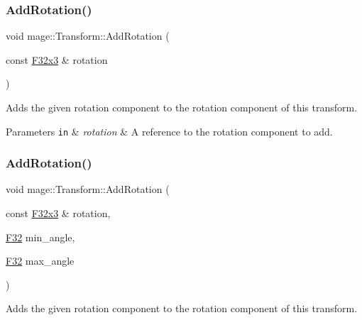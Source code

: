 \subsubsection{\texorpdfstring{Add\+Rotation()}{AddRotation()}\hspace{0.1cm}{\footnotesize\ttfamily [3/6]}}
{\footnotesize\ttfamily void mage\+::\+Transform\+::\+Add\+Rotation (\begin{DoxyParamCaption}\item[{const \mbox{\hyperlink{namespacemage_a1e3c7a882af461f161caa1cbddaf1fa2}{F32x3}} \&}]{rotation }\end{DoxyParamCaption})\hspace{0.3cm}{\ttfamily [noexcept]}}

Adds the given rotation component to the rotation component of this transform.


\begin{DoxyParams}[1]{Parameters}
\mbox{\tt in}  & {\em rotation} & A reference to the rotation component to add. \\
\hline
\end{DoxyParams}
\mbox{\label{classmage_1_1_transform_a7114cd014f43ea0354b7da4567149f19}} 
\subsubsection{\texorpdfstring{Add\+Rotation()}{AddRotation()}\hspace{0.1cm}{\footnotesize\ttfamily [4/6]}}
{\footnotesize\ttfamily void mage\+::\+Transform\+::\+Add\+Rotation (\begin{DoxyParamCaption}\item[{const \mbox{\hyperlink{namespacemage_a1e3c7a882af461f161caa1cbddaf1fa2}{F32x3}} \&}]{rotation,  }\item[{\mbox{\hyperlink{namespacemage_aa97e833b45f06d60a0a9c4fc22ae02c0}{F32}}}]{min\+\_\+angle,  }\item[{\mbox{\hyperlink{namespacemage_aa97e833b45f06d60a0a9c4fc22ae02c0}{F32}}}]{max\+\_\+angle }\end{DoxyParamCaption})\hspace{0.3cm}{\ttfamily [noexcept]}}

Adds the given rotation component to the rotation component of this transform.

